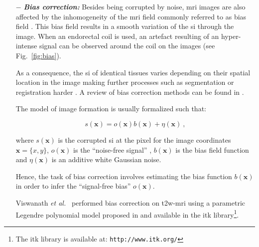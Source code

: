 \begin{enumerate}[leftmargin=*]
\item[$-$] \textbf{\textit{Bias correction:}} Besides being corrupted by noise, \ac{mri} images are also affected by the inhomogeneity of the \ac{mri} field commonly referred to as bias field \cite{Styner2000}.
This bias field results in a smooth variation of the \ac{si} through the image.
When an endorectal coil is used, an artefact resulting of an hyper-intense signal can be observed around the coil on the images (see Fig.~\ref{fig:bias}).

As a consequence, the \ac{si} of identical tissues varies depending on their spatial location in the image making further processes such as segmentation or registration harder \cite{Jungke1987,Vovk2007}.
A review of bias correction methods can be found in \cite{Vovk2007}.

{\color{blue}
The model of image formation is usually formalized such that:

\begin{equation}
	s(\mathbf{x}) = o(\mathbf{x})b(\mathbf{x}) + \eta(\mathbf{x}) \ ,
	\label{eq:biasmodel}
\end{equation}

\noindent where $s(\mathbf{x})$ is the corrupted \ac{si} at the pixel for the image coordinates $\mathbf{x} = \{x,y\}$, $o(\mathbf{x})$ is the ``noise-free signal'' , $b(\mathbf{x})$ is the bias field function and $\eta(\mathbf{x})$ is an additive white Gaussian noise.
%
%
%

Hence, the task of bias correction involves estimating the bias function $b(\mathbf{x})$ in order to infer the ``signal-free bias'' $o(\mathbf{x})$.
}

Viswanath \textit{et al.}~\cite{Viswanath2009} performed bias correction on \ac{t2w}-\ac{mri} using a parametric Legendre polynomial model proposed in \cite{Styner2000} and available in the \ac{itk} library\footnote{The \ac{itk} library is available at: \texttt{http://www.itk.org/}}.


\end{enumerate}
